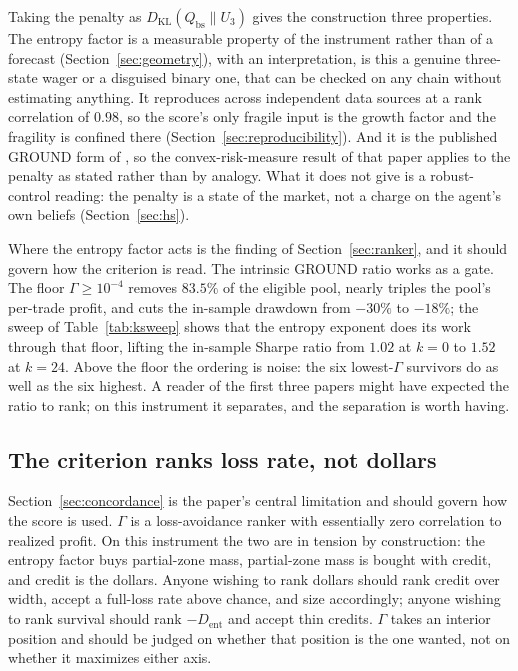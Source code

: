 \documentclass[11pt]{article}
\newcommand{\dkl}{D_{\mathrm{KL}}}
\newcommand{\dent}{D_{\mathrm{ent}}}
\newcommand{\Qbs}{Q_{\mathrm{bs}}}
\begin{document}
Taking the penalty as $\dkl(\Qbs \| U_3)$ gives the construction three
properties. The entropy factor is a measurable property of the instrument
rather than of a forecast (Section~\ref{sec:geometry}), with an interpretation,
is this a genuine three-state wager or a disguised binary one, that can be
checked on any chain without estimating anything. It reproduces across
independent data sources at a rank correlation of $0.98$, so the score's only
fragile input is the growth factor and the fragility is confined there
(Section~\ref{sec:reproducibility}). And it is the published GROUND form of
\cite{mercurio2020binary, mercurio2020gepo}, so the convex-risk-measure result
of that paper applies to the penalty as stated rather than by analogy. What it
does not give is a robust-control reading: the penalty is a state of the market,
not a charge on the agent's own beliefs (Section~\ref{sec:hs}).

Where the entropy factor acts is the finding of Section~\ref{sec:ranker}, and
it should govern how the criterion is read. The intrinsic GROUND ratio works as
a gate. The floor $\Gamma \geq 10^{-4}$ removes $83.5\%$ of the eligible pool,
nearly triples the pool's per-trade profit, and cuts the in-sample drawdown
from $-30\%$ to $-18\%$; the sweep of Table~\ref{tab:ksweep} shows that the
entropy exponent does its work through that floor, lifting the in-sample
Sharpe ratio from $1.02$ at $k = 0$ to $1.52$ at $k = 24$. Above the floor the
ordering is noise: the six lowest-$\Gamma$ survivors do as well as the six
highest. A reader of the first three papers might have expected the ratio to
rank; on this instrument it separates, and the separation is worth having.

\subsection{The criterion ranks loss rate, not dollars}

Section~\ref{sec:concordance} is the paper's central limitation and should
govern how the score is used. $\Gamma$ is a loss-avoidance ranker with
essentially zero correlation to realized profit. On this instrument the two
are in tension by construction: the entropy factor buys partial-zone mass,
partial-zone mass is bought with credit, and credit is the dollars. Anyone
wishing to rank dollars should rank credit over width, accept a full-loss rate
above chance, and size accordingly; anyone wishing to rank survival should
rank $-\dent$ and accept thin credits. $\Gamma$ takes an interior position and
should be judged on whether that position is the one wanted, not on whether it
maximizes either axis.
\end{document}

